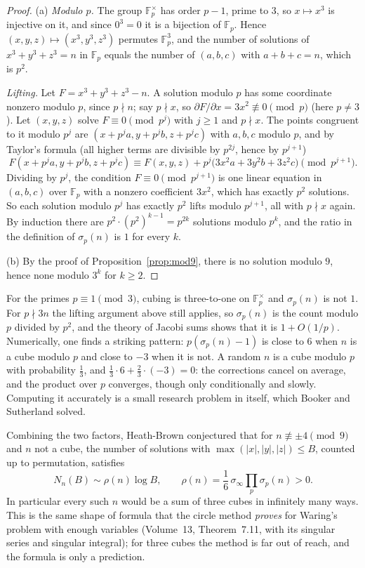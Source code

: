\begin{proof}
(a) \emph{Modulo $p$.} The group $\mathbb F_p^\times$ has order $p-1$, prime to $3$, so $x\mapsto x^3$ is injective on it, and since $0^3=0$ it is a bijection of $\mathbb F_p$. Hence $(x,y,z)\mapsto(x^3,y^3,z^3)$ permutes $\mathbb F_p^3$, and
the number of solutions of $x^3+y^3+z^3=n$ in $\mathbb F_p$ equals the number of $(a,b,c)$ with $a+b+c=n$, which is $p^2$.

\emph{Lifting.} Let $F=x^3+y^3+z^3-n$. A solution modulo $p$ has some coordinate nonzero modulo $p$, since $p\nmid n$; say $p\nmid x$, so $\partial F/\partial x=3x^2\not\equiv0\pmod p$ (here $p\ne3$). Let $(x,y,z)$
solve $F\equiv0\pmod{p^j}$ with $j\ge1$ and $p\nmid x$. The points congruent to it modulo $p^j$ are $(x+p^ja,y+p^jb,z+p^jc)$ with $a,b,c$ modulo $p$, and by Taylor's formula (all higher terms are
divisible by $p^{2j}$, hence by $p^{j+1}$)
\[
F(x+p^ja,y+p^jb,z+p^jc)\equiv F(x,y,z)+p^j\bigl(3x^2a+3y^2b+3z^2c\bigr)\pmod{p^{j+1}}.
\]
Dividing by $p^j$, the condition $F\equiv0\pmod{p^{j+1}}$ is one linear equation in $(a,b,c)$ over $\mathbb F_p$ with a nonzero coefficient $3x^2$, which has exactly $p^2$ solutions. So each solution modulo $p^j$ has exactly $p^2$
lifts modulo $p^{j+1}$, all with $p\nmid x$ again. By induction there are $p^2\cdot(p^2)^{k-1}=p^{2k}$ solutions modulo $p^k$, and the ratio in the definition of $\sigma_p(n)$ is $1$ for every $k$.

(b) By the proof of Proposition~\ref{prop:mod9}, there is no solution modulo $9$, hence none modulo $3^k$ for $k\ge2$.
\end{proof}

For the primes $p\equiv1\pmod3$, cubing is three-to-one on $\mathbb F_p^\times$ and $\sigma_p(n)$ is not $1$. For $p\nmid3n$ the lifting argument above still applies, so $\sigma_p(n)$ is the count modulo $p$ divided by $p^2$, and the theory of Jacobi sums shows that it is $1+O(1/p)$. Numerically, one finds a striking pattern: $p(\sigma_p(n)-1)$ is close to $6$ when $n$ is a cube modulo $p$ and close to $-3$ when it is not. A random $n$ is a cube modulo $p$ with probability $\frac13$, and $\frac13\cdot6+\frac23\cdot(-3)=0$: the corrections cancel on average, and the product over $p$ converges, though only conditionally and slowly. Computing it accurately is a small research problem in itself, which Booker and Sutherland solved.

\begin{remark}\label{rem:hb}
Combining the two factors, Heath-Brown conjectured that for $n\not\equiv\pm4\pmod9$ and $n$ not a cube, the number of solutions with $\max(|x|,|y|,|z|)\le B$, counted up to permutation, satisfies
\[
N_n(B)\sim\rho(n)\log B,\qquad\rho(n)=\frac16\,\sigma_\infty\prod_p\sigma_p(n)>0.
\]
In particular every such $n$ would be a sum of three cubes in infinitely many ways. This is the same shape of formula that the circle method \emph{proves} for Waring's problem with
enough variables (Volume~13, Theorem~7.11, with its singular series and singular integral); for three cubes the method is far out of reach, and the formula is only a prediction.
\end{remark}

